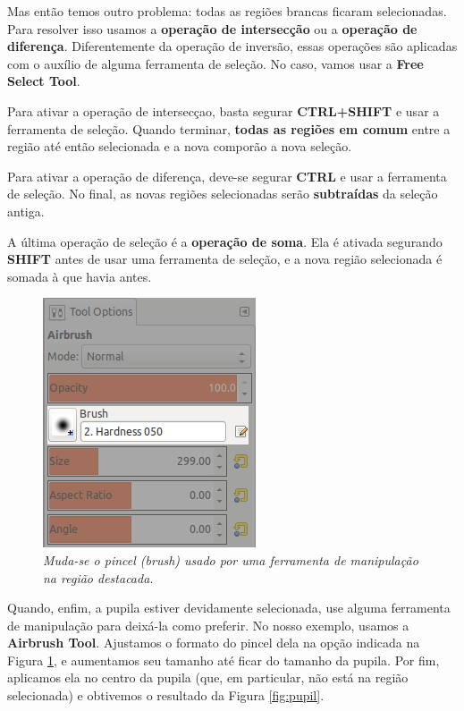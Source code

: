 \documentclass[12pt,onecolumn]{article}
\begin{document}
    Mas então temos outro problema: todas as regiões brancas ficaram
    selecionadas. Para resolver isso usamos a {\bf operação de intersecção} ou
    a {\bf operação de diferença}. Diferentemente da operação de inversão, essas
    operações são aplicadas com o auxílio de alguma ferramenta de seleção. No
    caso, vamos usar a {\bf Free Select Tool}.
    
    Para ativar a operação de intersecçao, basta segurar {\bf CTRL+SHIFT} e usar
    a ferramenta de seleção. Quando terminar, {\bf todas as regiões em comum}
    entre a região até então selecionada e a nova comporão a nova seleção.
    
    Para ativar a operação de diferença, deve-se segurar {\bf CTRL} e usar a
    ferramenta de seleção. No final, as novas regiões selecionadas serão {\bf
    subtraídas} da seleção antiga.
    
    \begin{framed}
      A última operação de seleção é a {\bf operação de soma}. Ela é ativada
      segurando {\bf SHIFT} antes de usar uma ferramenta de seleção, e a nova
      região selecionada é somada à que havia antes.
    \end{framed}
    
    \begin{figure}[h]
      \centering
      \includegraphics[width=.5\textwidth]{screenshots/04-setting_brush.png}
      \caption{
        \footnotesize
        \it
        Muda-se o pincel ({\it brush}) usado por uma ferramenta de manipulação
        na região destacada.
      }
      \label{fig:setting_brush}
    \end{figure}
    
    Quando, enfim, a pupila estiver devidamente selecionada, use alguma
    ferramenta de manipulação para deixá-la como preferir. No nosso exemplo,
    usamos a {\bf Airbrush Tool}. Ajustamos o formato do pincel dela na opção
    indicada na Figura \ref{fig:setting_brush}, e aumentamos seu tamanho até
    ficar do tamanho da pupila. Por fim, aplicamos ela no centro da pupila (que,
    em particular, não está na região selecionada) e obtivemos o resultado da
    Figura \ref{fig:pupil}.
    
\end{document}
